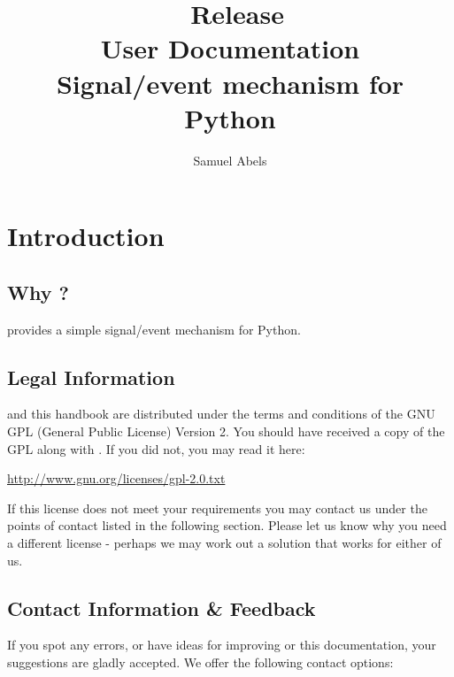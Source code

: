 \title{\productname\ Release \productversion\\
User Documentation\\
\vspace{5 mm}
\large Signal/event mechanism for Python}
\author{Samuel Abels}


\maketitle
\tableofcontents

\newpage
\section{Introduction}
\subsection{Why \productname?}

\product provides a simple signal/event mechanism for Python.

\subsection{Legal Information}

\product and this handbook are distributed under the terms and conditions 
of the GNU GPL (General Public License) Version 2. You should have received 
a copy of the GPL along with \product. If you did not, you may read it here:

\vspace{1em}
\url{http://www.gnu.org/licenses/gpl-2.0.txt}
\vspace{1em}

If this license does not meet your requirements you may contact us under 
the points of contact listed in the following section. Please let us know 
why you need a different license - perhaps we may work out a solution 
that works for either of us.


\subsection{Contact Information \& Feedback}

If you spot any errors, or have ideas for improving \product or this 
documentation, your suggestions are gladly accepted.
We offer the following contact options: \\

